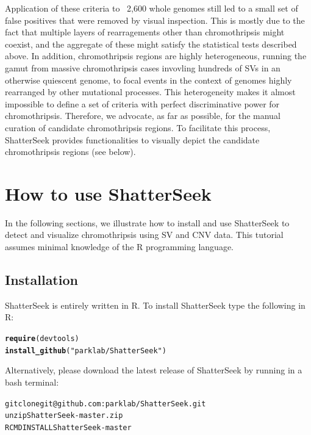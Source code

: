 \documentclass[twoside,a4wide,11pt]{article}\usepackage[]{graphicx}\usepackage[]{color}
\makeatletter
\newcommand{\hlstr}[1]{\textcolor[rgb]{0.192,0.494,0.8}{#1}}%
\newcommand{\hlstd}[1]{\textcolor[rgb]{0.345,0.345,0.345}{#1}}%
\newcommand{\hlkwd}[1]{\textcolor[rgb]{0.737,0.353,0.396}{\textbf{#1}}}%
\newenvironment{kframe}{%
 \def\at@end@of@kframe{}%
 \ifinner\ifhmode%
  \def\at@end@of@kframe{\end{minipage}}%
  \begin{minipage}{\columnwidth}%
 \fi\fi%
 \def\FrameCommand##1{\hskip\@totalleftmargin \hskip-\fboxsep
 \colorbox{shadecolor}{##1}\hskip-\fboxsep
     \hskip-\linewidth \hskip-\@totalleftmargin \hskip\columnwidth}%
 \MakeFramed {\advance\hsize-\width
   \@totalleftmargin\z@ \linewidth\hsize
   \@setminipage}}%
 {\par\unskip\endMakeFramed%
 \at@end@of@kframe}
\newenvironment{knitrout}{}{} %
\makeatother
\begin{document}
Application of these criteria to ~2,600 whole genomes still led to a small set of false positives that were removed by visual inspection. 
This is mostly due to the fact that multiple layers of rearragements other than chromothripsis might coexist, and the aggregate of these might satisfy the statistical tests described above.
In addition, chromothripsis regions are highly heterogeneous, running the gamut from massive chromothripsis cases 
invovling hundreds of SVs in an otherwise quiescent genome, 
to focal events in the context of genomes highly rearranged by other mutational processes.
This heterogeneity makes it almost impossible to define a set of criteria with perfect
discriminative power for chromothripsis.
Therefore, we advocate, as far as possible, for the manual curation of candidate chromothripsis regions. 
To facilitate this process, ShatterSeek provides functionalities to visually depict the candidate chromothripsis regions (see below). 


\section{How to use ShatterSeek}
In the following sections, we illustrate how to install and use ShatterSeek to detect and visualize chromothripsis 
using SV and CNV data. 
This tutorial assumes minimal knowledge of the R programming language.

\subsection{Installation}
ShatterSeek is entirely written in R. 
To install ShatterSeek type the following in R: 
\begin{knitrout}
\color{fgcolor}\begin{kframe}
\begin{alltt}
\hlkwd{require}\hlstd{(devtools)}
\hlkwd{install_github}\hlstd{(}\hlstr{"parklab/ShatterSeek"}\hlstd{)}
\end{alltt}
\end{kframe}
\end{knitrout}
Alternatively, please download the latest release of ShatterSeek by running in a bash terminal:\\
\begin{knitrout}
\color{fgcolor}\begin{kframe}
\begin{alltt}
git clone git@github.com:parklab/ShatterSeek.git 
unzip ShatterSeek-master.zip 
R CMD INSTALL ShatterSeek-master
\end{alltt}
\end{kframe}
\end{knitrout}
\end{document}
